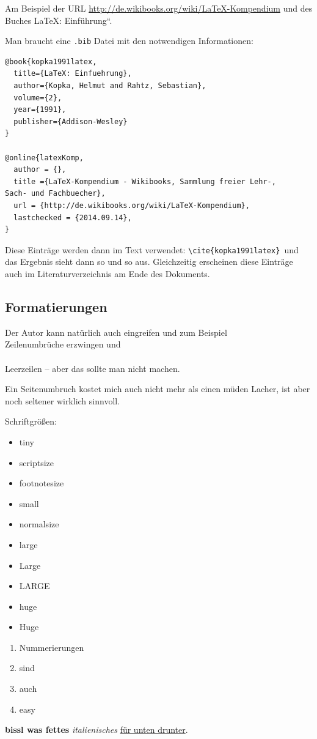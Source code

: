 Am Beispiel der URL \url{http://de.wikibooks.org/wiki/LaTeX-Kompendium}
und des Buches \quotedblbase \LaTeX{}: Einführung``.

Man braucht eine \texttt{.bib} Datei mit den notwendigen Informationen:

\begin{lstlisting}[language={[LaTeX]TeX}]
@book{kopka1991latex,
  title={LaTeX: Einfuehrung},
  author={Kopka, Helmut and Rahtz, Sebastian},
  volume={2},
  year={1991},
  publisher={Addison-Wesley} 
}

@online{latexKomp,
  author = {},
  title ={LaTeX-Kompendium - Wikibooks, Sammlung freier Lehr-, 
Sach- und Fachbuecher},
  url = {http://de.wikibooks.org/wiki/LaTeX-Kompendium},
  lastchecked = {2014.09.14},
}
\end{lstlisting}


Diese Einträge werden dann im Text verwendet: \texttt{\textbackslash{}cite\{kopka1991latex\}
}und das Ergebnis sieht dann so \citep{kopka1991latex} und so \citep{latexKomp}
aus. Gleichzeitig erscheinen diese Einträge auch im Literaturverzeichnis
am Ende des Dokuments.


\subsection{Formatierungen }

Der Autor kann natürlich auch eingreifen und zum Beispiel\\
Zeilenumbrüche erzwingen und \\
\\
Leerzeilen -- aber das sollte man nicht machen. \newpage{}

Ein Seitenumbruch kostet mich auch nicht mehr als einen müden Lacher,
ist aber noch seltener wirklich sinnvoll.

Schriftgrößen:
\begin{itemize}
\item {\tiny{}tiny} 
\item {\scriptsize{}scriptsize} 
\item {\footnotesize{}footnotesize} 
\item {\small{}small} 
\item normalsize 
\item {\large{}large} 
\item {\Large{}Large} 
\item {\LARGE{}LARGE} 
\item {\huge{}huge} 
\item {\Huge{}Huge} \end{itemize}
\begin{enumerate}
\item Nummerierungen
\item sind 
\item auch 
\item easy
\end{enumerate}
\textbf{bissl was fettes} \textit{italienisches} \uline{für unten
drunter}.

